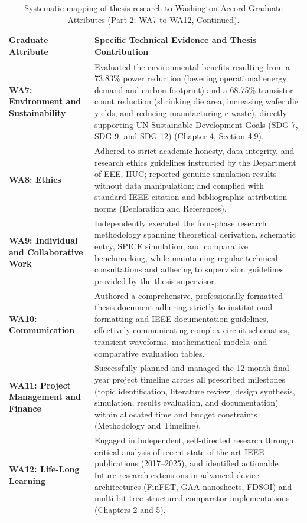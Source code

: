 \documentclass[12pt,a4paper,oneside]{report}
\begin{document}
\clearpage

\begin{table}[p]
\centering
\singlespacing
\small
\renewcommand{\arraystretch}{1.25}
\addtocounter{table}{-1}
\renewcommand{\theHtable}{4.9.part2}
\caption{Systematic mapping of thesis research to Washington Accord Graduate Attributes (Part 2: WA7 to WA12, Continued).}
\label{tab:wa_mapping_part2}
\vspace{0.25cm}
\begin{tabular}{|>{\raggedright\arraybackslash}p{3.6cm}|>{\raggedright\arraybackslash}p{10.0cm}|}
\hline
\textbf{Graduate Attribute} & \textbf{Specific Technical Evidence and Thesis Contribution} \\
\hline
\textbf{WA7: Environment and Sustainability} & Evaluated the environmental benefits resulting from a 73.83\% power reduction (lowering operational energy demand and carbon footprint) and a 68.75\% transistor count reduction (shrinking die area, increasing wafer die yields, and reducing manufacturing e-waste), directly supporting UN Sustainable Development Goals (SDG 7, SDG 9, and SDG 12) (Chapter 4, Section 4.9). \\
\hline
\textbf{WA8: Ethics} & Adhered to strict academic honesty, data integrity, and research ethics guidelines instructed by the Department of EEE, IIUC; reported genuine simulation results without data manipulation; and complied with standard IEEE citation and bibliographic attribution norms (Declaration and References). \\
\hline
\textbf{WA9: Individual and Collaborative Work} & Independently executed the four-phase research methodology spanning theoretical derivation, schematic entry, SPICE simulation, and comparative benchmarking, while maintaining regular technical consultations and adhering to supervision guidelines provided by the thesis supervisor. \\
\hline
\textbf{WA10: Communication} & Authored a comprehensive, professionally formatted thesis document adhering strictly to institutional formatting and IEEE documentation guidelines, effectively communicating complex circuit schematics, transient waveforms, mathematical models, and comparative evaluation tables. \\
\hline
\textbf{WA11: Project Management and Finance} & Successfully planned and managed the 12-month final-year project timeline across all prescribed milestones (topic identification, literature review, design synthesis, simulation, results evaluation, and documentation) within allocated time and budget constraints (Methodology and Timeline). \\
\hline
\textbf{WA12: Life-Long Learning} & Engaged in independent, self-directed research through critical analysis of recent state-of-the-art IEEE publications (2017--2025), and identified actionable future research extensions in advanced device architectures (FinFET, GAA nanosheets, FDSOI) and multi-bit tree-structured comparator implementations (Chapters 2 and 5). \\
\hline
\end{tabular}
\end{table}
\end{document}
